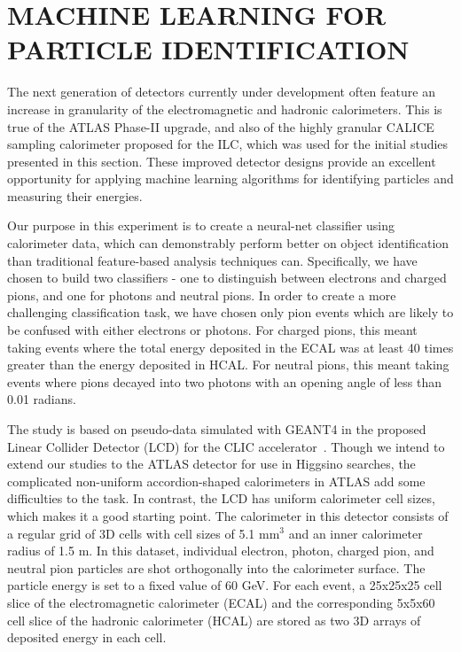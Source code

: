 \documentclass{article}
\begin{document}
\section*{MACHINE LEARNING FOR PARTICLE IDENTIFICATION}

The next generation of detectors currently under development often feature an increase in granularity of the electromagnetic and hadronic calorimeters. This is true of the ATLAS Phase-II upgrade, and also of the highly granular CALICE sampling calorimeter proposed for the ILC, which was used for the initial studies presented in this section. These improved detector designs provide an excellent opportunity for applying machine learning algorithms for identifying particles and measuring their energies.

Our purpose in this experiment is to create a neural-net classifier using calorimeter data, which can demonstrably perform better on object identification than traditional feature-based analysis techniques can. Specifically, we have chosen to build two classifiers - one to distinguish between electrons and charged pions, and one for photons and neutral pions. In order to create a more challenging classification task, we have chosen only pion events which are likely to be confused with either electrons or photons. For charged pions, this meant taking events where the total energy deposited in the ECAL was at least 40 times greater than the energy deposited in HCAL. For neutral pions, this meant taking events where pions decayed into two photons with an opening angle of less than 0.01 radians.

The study is based on pseudo-data simulated with GEANT4 in the proposed Linear Collider Detector (LCD) for the CLIC accelerator~\cite{Lebrun}. Though we intend to extend our studies to the ATLAS detector for use in Higgsino searches, the complicated non-uniform accordion-shaped calorimeters in ATLAS add some difficulties to the task. In contrast, the LCD has uniform calorimeter cell sizes, which makes it a good starting point. The calorimeter in this detector consists of a regular grid of 3D cells with cell sizes of 5.1 mm$^3$ and an inner calorimeter radius of 1.5 m. In this dataset, individual electron, photon, charged pion, and neutral pion particles are shot orthogonally into the calorimeter surface. The particle energy is set to a fixed value of 60 GeV. For each event, a 25x25x25 cell slice of the electromagnetic calorimeter (ECAL) and the corresponding 5x5x60 cell slice of the hadronic calorimeter (HCAL) are stored as two 3D arrays of deposited energy in each cell.
\end{document}
